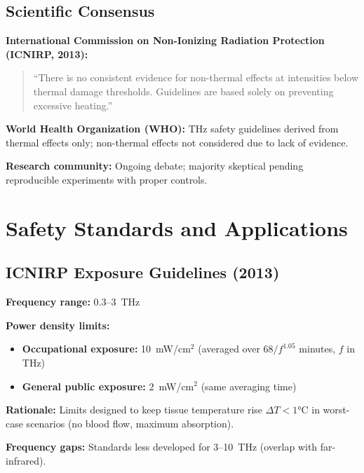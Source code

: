 \subsection{Scientific Consensus}

\textbf{International Commission on Non-Ionizing Radiation Protection (ICNIRP, 2013):}
\begin{quote}
``There is no consistent evidence for non-thermal effects at intensities below thermal damage thresholds. Guidelines are based solely on preventing excessive heating.''
\end{quote}

\textbf{World Health Organization (WHO):} THz safety guidelines derived from thermal effects only; non-thermal effects not considered due to lack of evidence.

\textbf{Research community:} Ongoing debate; majority skeptical pending reproducible experiments with proper controls.

\section{Safety Standards and Applications}
\label{sec:safety-standards}

\subsection{ICNIRP Exposure Guidelines (2013)}

\textbf{Frequency range:} 0.3--3~THz

\textbf{Power density limits:}
\begin{itemize}
\item \textbf{Occupational exposure:} 10~mW/cm$^2$ (averaged over $68/f^{1.05}$ minutes, $f$ in THz)
\item \textbf{General public exposure:} 2~mW/cm$^2$ (same averaging time)
\end{itemize}

\textbf{Rationale:} Limits designed to keep tissue temperature rise $\Delta T < 1°$C in worst-case scenarios (no blood flow, maximum absorption).

\textbf{Frequency gaps:} Standards less developed for 3--10~THz (overlap with far-infrared).

